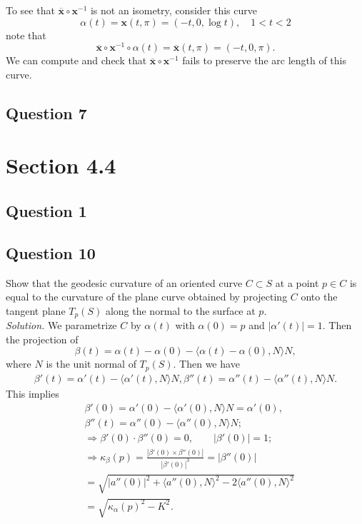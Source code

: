 \documentclass[12pt]{article}
\begin{document}
To see that \(\overline{\mathbf{x}} \circ \mathbf{x}^{-1}\) is not an isometry,
consider this curve
\[ \alpha(t) = \mathbf{x}(t,\pi) = (-t, 0, \log t),\quad 1<t<2 \]
note that
\[ \overline{\mathbf{x}} \circ \mathbf{x}^{-1} \circ \alpha(t) = \overline{\mathbf{x}}(t,\pi) = (-t, 0, \pi). \]
We can compute and check that \(\overline{\mathbf{x}} \circ \mathbf{x}^{-1}\) fails to preserve the arc length of this curve.


\subsection*{Question 7}

\section*{Section 4.4}
\subsection*{Question 1}

\subsection*{Question 10}
Show that the geodesic curvature of an oriented curve $C \subset S$ at a point $p \in C$ is equal to the curvature of the plane curve obtained by projecting $C$ onto the tangent plane $T_p(S)$ along the normal to the surface at $p$.\\

\textit{Solution.} We parametrize $C$ by $\alpha(t)$ with $\alpha(0)=p$ and $|\alpha'(t)|=1$. Then the projection of 
\begin{equation*}
    \beta(t) = \alpha(t)-\alpha(0) - \langle\alpha(t)-\alpha(0),N\rangle N,
\end{equation*}
where $N$ is the unit normal of $T_p(S)$. Then we have\begin{align*}
    \beta'(t) = \alpha'(t) - \langle\alpha'(t),N\rangle N,
    \beta''(t) = \alpha''(t) - \langle\alpha''(t),N\rangle N.
\end{align*} 
This implies \begin{align*}
    &\beta'(0) = \alpha'(0) - \langle\alpha'(0),N\rangle N = \alpha'(0),\\
    &\beta''(t) = \alpha''(0) - \langle \alpha''(0),N\rangle N;\\
    &\Rightarrow  \beta'(0)\cdot \beta''(0)= 0,\qquad |\beta'(0)|=1;\\
    &\Rightarrow  \kappa_{\beta}(p) =  \frac{|\beta'(0)\times\beta''(0)|}{|\beta'(0)|^3}=|\beta''(0)|\\
    &= \sqrt{|a''(0)|^2+\langle a''(0),N\rangle^2-2\langle a''(0),N\rangle^2}\\
    &=\sqrt{\kappa_\alpha(p)^2-K^2}.
\end{align*}
\end{document}
